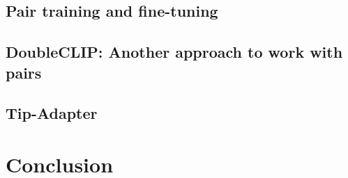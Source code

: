 \documentclass[11pt,compress]{beamer} %
\begin{document}
\subsection{Pair training and fine-tuning}

\subsection{DoubleCLIP: Another approach to work with pairs}

\subsection{Tip-Adapter}

\section{Conclusion}
\end{document}

